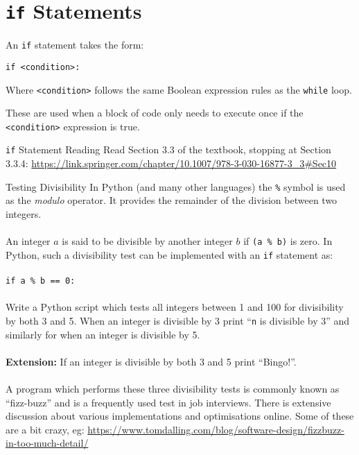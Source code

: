 \documentclass{lab}
\begin{document}
\pagebreak
\section{\texttt{if} Statements}
An \texttt{if} statement takes the form:

\texttt{if <condition>:}

Where \texttt{<condition>} follows the same Boolean expression rules as the \texttt{while} loop.

These are used when a block of code only needs to execute once if the \texttt{<condition>} expression is true.

\begin{task}{\texttt{if} Statement Reading}{}
Read Section 3.3 of the textbook, stopping at Section 3.3.4: \url{https://link.springer.com/chapter/10.1007/978-3-030-16877-3_3#Sec10} 
\end{task}

\begin{task}{Testing Divisibility}{}
In Python (and many other languages) the \texttt{\%} symbol is used as the \textit{modulo} operator. It provides the remainder of the division between two integers.
\\~\\
An integer $a$ is said to be divisible by another integer $b$ if \texttt{(a \% b)} is zero. In Python, such a divisibility test can be implemented with an \texttt{if} statement as:
\\~\\
\texttt{if a \% b == 0:}
\\~\\
Write a Python script which tests all integers between 1 and 100 for divisibility by both 3 and 5. When an integer is divisible by 3 print ``\texttt{n} is divisible by 3'' and similarly for when an integer is divisible by 5.
\\~\\
\textbf{Extension:} If an integer is divisible by both 3 and 5 print ``Bingo!''.
\\~\\
A program which performs these three divisibility tests is commonly known as ``fizz-buzz'' and is a frequently used test in job interviews. There is extensive discussion about various implementations and optimisations online. Some of these are a bit crazy, eg: \url{https://www.tomdalling.com/blog/software-design/fizzbuzz-in-too-much-detail/}
\end{task}

\pagebreak
\end{document}

